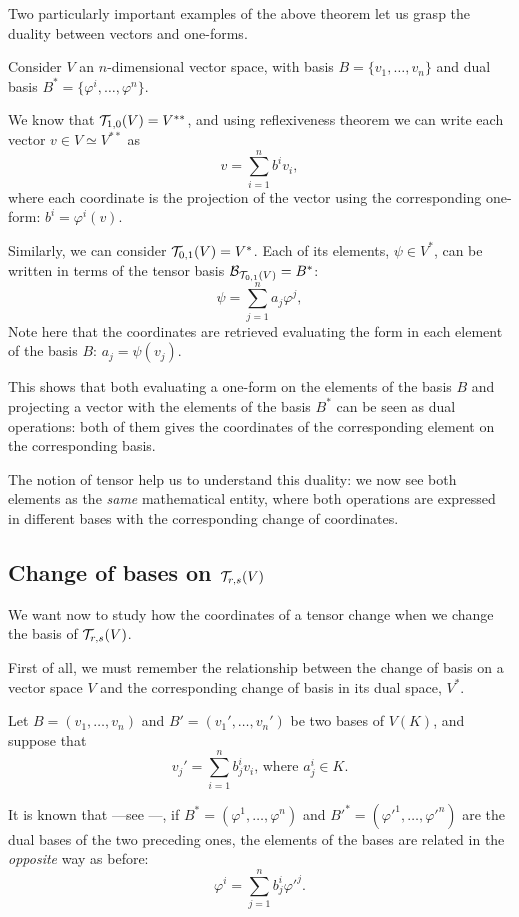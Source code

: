Two particularly important examples of the above theorem let us grasp the duality between vectors and one-forms.

Consider $V$ an $n$-dimensional vector space, with basis $B = \{v_1, \dots, v_n\}$ and dual basis $B^* = \{\varphi^i, \dots, \varphi^n\}$.

We know that ${\mathcal T}_{1,0}(V) = V^{**}$, and using reflexiveness theorem we can write each vector $v \in V \simeq V^{**}$ as
\[
v = \sum_{i=1}^n b^i v_i,
\]
where each coordinate is the projection of the vector using the corresponding one-form: $b^i = \varphi^i(v)$.

Similarly, we can consider ${\mathcal T}_{0,1}(V) = V^*$. Each of its elements, $\psi \in V^*$, can be written in terms of the tensor basis $\mathcal{B}_{{\mathcal T}_{0,1}(V)} = B^*$:
\[
	\psi = \sum_{j=1}^n a_j \varphi^j,
\]
Note here that the coordinates are retrieved evaluating the form in each element of the basis $B$: $a_j = \psi(v_j)$.

This shows that both evaluating a one-form on the elements of the basis $B$ and projecting a vector with the elements of the basis $B^*$ can be seen as dual operations: both of them gives the coordinates of the corresponding element on the corresponding basis.

The notion of tensor help us to understand this duality: we now see both elements as the \emph{same} mathematical entity, where both operations are expressed in different bases with the corresponding change of coordinates.

\subsection{Change of bases on ${\mathcal T}_{r,s}(V)$}

We want now to study how the coordinates of a tensor change when we change the basis of ${\mathcal T}_{r,s}(V)$.

First of all, we must remember the relationship between the change of basis on a vector space $V$ and the corresponding change of basis in its dual space, $V^*$.

Let $B = (v_1, \dots, v_n)$ and $B' = (v_1', \dots, v_n')$ be two bases of $V(K)$, and suppose that
\begin{equation}
	\label{eq:changeV}
	v_j' = \sum_{i=1}^n b_j^i v_i \textrm{, where } a_j^i \in K.
\end{equation}

It is known that ---see \cite[p. 162]{romero86}---, if $B^* = (\varphi^1, \dots, \varphi^n)$ and $B'^* = (\varphi'^1, \dots, \varphi'^n)$ are the dual bases of the two preceding ones, the elements of the bases are related in the \emph{opposite} way as before:
\[
	\varphi^i = \sum_{j=1}^n b_j^i \varphi'^j.
\]

